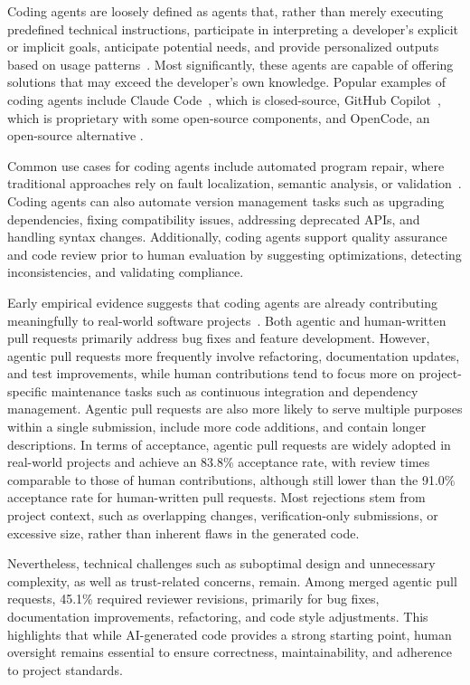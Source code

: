 \documentclass[
english,                 %
bibtex,                  %
includeExtraAbstracts, %
]{kththesis}
\numberwithin{listing}{chapter}
\begin{document}
Coding agents are loosely defined as agents that, rather than merely executing predefined technical instructions, participate in interpreting a developer's explicit or implicit goals, anticipate potential needs, and provide personalized outputs based on usage patterns~\cite{meske_vibe_2025}. Most significantly, these agents are capable of offering solutions that may exceed the developer's own knowledge. Popular examples of coding agents include Claude Code~\cite{anthropic_pbc_claude_2026}, which is closed-source, GitHub Copilot~\cite{github_inc_github_2026-1}, which is proprietary with some open-source components, and OpenCode, an open-source alternative \cite{anomaly_innovations_inc_anomalycoopencode_2026}.

Common use cases for coding agents include automated program repair, where traditional approaches rely on fault localization, semantic analysis, or validation~\cite{puvvadi_coding_2025}. Coding agents can also automate version management tasks such as upgrading dependencies, fixing compatibility issues, addressing deprecated \glspl{API}, and handling syntax changes. Additionally, coding agents support quality assurance and code review prior to human evaluation by suggesting optimizations, detecting inconsistencies, and validating compliance.

Early empirical evidence suggests that coding agents are already contributing meaningfully to real-world software projects~\cite{watanabe_use_2026}. Both agentic and human-written pull requests primarily address bug fixes and feature development. However, agentic pull requests more frequently involve refactoring, documentation updates, and test improvements, while human contributions tend to focus more on project-specific maintenance tasks such as continuous integration and dependency management. Agentic pull requests are also more likely to serve multiple purposes within a single submission, include more code additions, and contain longer descriptions. In terms of acceptance, agentic pull requests are widely adopted in real-world projects and achieve an 83.8\% acceptance rate, with review times comparable to those of human contributions, although still lower than the 91.0\% acceptance rate for human-written pull requests. Most rejections stem from project context, such as overlapping changes, verification-only submissions, or excessive size, rather than inherent flaws in the generated code. 

Nevertheless, technical challenges such as suboptimal design and unnecessary complexity, as well as trust-related concerns, remain. Among merged agentic pull requests, 45.1\% required reviewer revisions, primarily for bug fixes, documentation improvements, refactoring, and code style adjustments. This highlights that while \gls{AI}-generated code provides a strong starting point, human oversight remains essential to ensure correctness, maintainability, and adherence to project standards.
\end{document}
